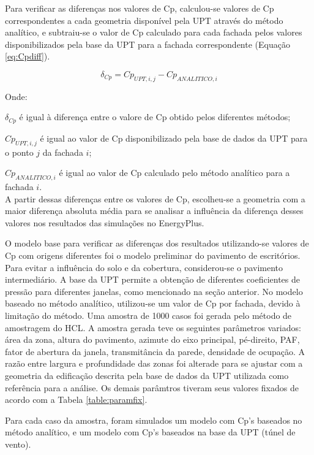 \documentclass[brazil,hardcopy,openany,a5paper]{ufscthesis}
\begin{document}
		
		Para verificar as diferenças nos valores de Cp, calculou-se valores de Cp correspondentes a cada geometria disponível pela UPT através do método analítico, e subtraiu-se o valor de Cp calculado para cada fachada pelos valores disponibilizados pela base da UPT para a fachada correspondente (Equação \ref{eq:Cpdiff}).
		
		\begin{equation}
		\label{eq:Cpdiff}
		\delta_{Cp} = Cp_{UPT,i,j} - Cp_{ANALITICO, i}
		\end{equation}
		
		Onde:
		
		$\delta_{Cp}$ é igual à diferença entre o valore de Cp obtido pelos diferentes métodos;
		
		$Cp_{UPT,i,j}$ é igual ao valor de Cp disponibilizado pela base de dados da UPT para o ponto $j$ da fachada $i$;
		
		$Cp_{ANALITICO, i}$ é igual ao valor de Cp calculado pelo método analítico para a fachada $i$.
		\\
		
		A partir dessas diferenças entre os valores de Cp, escolheu-se a geometria com a maior diferença absoluta média para se analisar a influência da diferença desses valores nos resultados das simulações no EnergyPlus.
		
		O modelo base para verificar as diferenças dos resultados utilizando-se valores de Cp com origens diferentes foi o modelo preliminar do pavimento de escritórios. Para evitar a influência do solo e da cobertura, considerou-se o pavimento intermediário. A base da UPT permite a obtenção de diferentes coeficientes de pressão para diferentes janelas, como mencionado na seção anterior. No modelo baseado no método analítico, utilizou-se um valor de Cp por fachada, devido à limitação do método. Uma amostra de 1000 casos foi gerada pelo método de amostragem do HCL. A amostra gerada teve os seguintes parâmetros variados: área da zona, altura do pavimento, azimute do eixo principal, pé-direito, PAF, fator de abertura da janela, transmitância da parede, densidade de ocupação. A razão entre largura e profundidade das zonas foi alterade para se ajustar com a geometria da edificação descrita pela base de dados da UPT utilizada como referência para a análise. Os demais parâmtros tiveram seus valores fixados de acordo com a Tabela \ref{table:paramfix}.
				
		Para cada caso da amostra, foram simulados um modelo com Cp’s baseados no método analítico, e um modelo com Cp’s baseados na base da UPT (túnel de vento).
		
\end{document}
